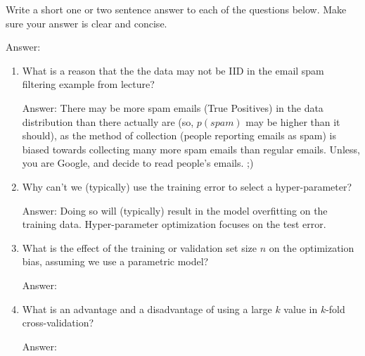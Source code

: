 \documentclass{article}
\newcommand{\blu}[1]{{\textcolor{blu}{#1}}}
\newenvironment{answer}{\par\begingroup\color{gre}Answer: }{\endgroup}
\let\ask\blu
\begin{document}
    \ask{Write a short one or two sentence answer to each of the questions below}. Make sure your answer is clear and concise.
    \begin{answer}

    \end{answer}
    \begin{enumerate}
        \item What is a reason that the the data may not be IID in the email spam filtering example from lecture?
        \begin{answer}
        There may be more spam emails (True Positives) in the data distribution than there actually are (so, $p(spam)$ may be higher than it should), as the method of collection (people reporting emails as spam) is biased towards collecting many more spam emails than regular emails. Unless, you are Google, and decide to read people's emails. ;)
        \end{answer}
        \item Why can't we (typically) use the training error to select a hyper-parameter?
        \begin{answer}
        Doing so will (typically) result in the model overfitting on the training data. Hyper-parameter optimization focuses on the test error.
        \end{answer}
        \item What is the effect of the training or validation set size $n$ on the optimization bias, assuming we use a parametric model?
        \begin{answer}

        \end{answer}
        \item What is an advantage and a disadvantage of using a large $k$ value in $k$-fold cross-validation?
        \begin{answer}


\end{answer}
\end{enumerate}
\end{document}
